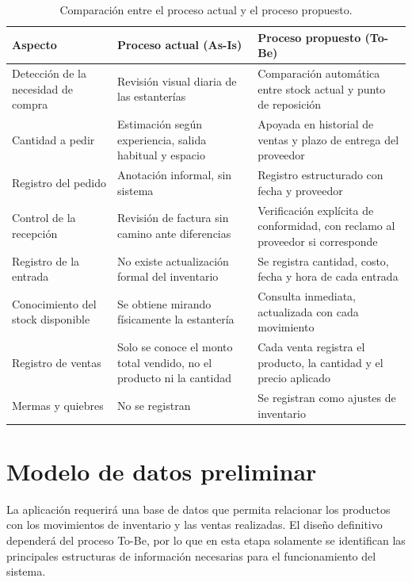 \documentclass[10pt,a4paper]{article}
\begin{document}
\begin{table}[H]
\centering
\small
\begin{tabular}{p{3.2cm}p{5.3cm}p{5.3cm}}
\toprule
\textbf{Aspecto} & \textbf{Proceso actual (As-Is)} & \textbf{Proceso propuesto (To-Be)} \\
\midrule
Detección de la necesidad de compra &
Revisión visual diaria de las estanterías &
Comparación automática entre stock actual y punto de reposición \\
Cantidad a pedir &
Estimación según experiencia, salida habitual y espacio &
Apoyada en historial de ventas y plazo de entrega del proveedor \\
Registro del pedido &
Anotación informal, sin sistema &
Registro estructurado con fecha y proveedor \\
Control de la recepción &
Revisión de factura sin camino ante diferencias &
Verificación explícita de conformidad, con reclamo al proveedor si corresponde \\
Registro de la entrada &
No existe actualización formal del inventario &
Se registra cantidad, costo, fecha y hora de cada entrada \\
Conocimiento del stock disponible &
Se obtiene mirando físicamente la estantería &
Consulta inmediata, actualizada con cada movimiento \\
Registro de ventas &
Solo se conoce el monto total vendido, no el producto ni la cantidad &
Cada venta registra el producto, la cantidad y el precio aplicado \\
Mermas y quiebres &
No se registran &
Se registran como ajustes de inventario \\
\bottomrule
\end{tabular}
\caption{Comparación entre el proceso actual y el proceso propuesto.}
\end{table}



\section{Modelo de datos preliminar}

La aplicación requerirá una base de datos que permita relacionar los productos con los movimientos de inventario y las ventas realizadas. El diseño definitivo dependerá del proceso To-Be, por lo que en esta etapa solamente se identifican las principales estructuras de información necesarias para el funcionamiento del sistema.
\end{document}
